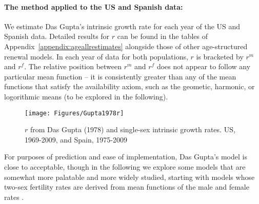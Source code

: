 \paragraph{The method applied to the US and Spanish data: } We estimate Das
Gupta's intrinsic growth rate for each year of the US and Spanish data. 
Detailed results for $r$ can be found in the tables of
Appendix~\ref{appendix:ageallrestimates} alongside those of other
age-structured renewal models. In each year of data for both populations, $r$ is
bracketed by $r^m$ and $r^f$. The relative position between $r^m$ and $r^f$ does not appear to follow any
particular mean function -- it is consistently greater than any of the mean
functions that satisfy the availability axiom, such as the geometic, harmonic,
or logorithmic means (to be explored in the following).

\begin{figure}[ht!]
        \centering  
          \caption{$r$ from Das Gupta (1978) and single-sex intrinsic growth rates. US, 1969-2009, and Spain, 1975-2009}
           \texttt{[image: Figures/Gupta1978r]}
          \label{fig:Gupta1978r}
\end{figure}

For purposes of prediction and ease of implementation, Das Gupta's model is
close to acceptable, though in the following we explore some models that
are somewhat more palatable and more widely studied, starting with models whose
two-sex fertility rates are derived from mean functions of the male
and female rates \citep{schoen1981harmonic}.

\FloatBarrier
